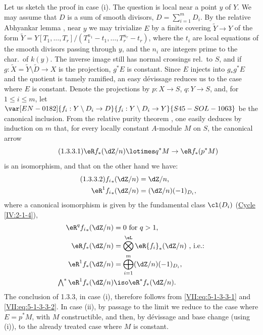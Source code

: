 Let us sketch the proof in case (i). The question is local near a point $y$
of $Y$. We may assume that $D$ is a sum of smooth divisors,
$D=\sum_{i=1}^m D_i$. By the relative Abhyankar lemma
, near $y$ we may trivialize $E$ by a finite covering
$\widetilde Y\to Y$ of the form
$\widetilde Y=Y[T_1,\dots,T_r]/(T_1^{n_1}-t_1,\dots,T_r^{n_r}-t_r)$, where the
$t_i$ are local equations of the smooth divisors passing through $y$, and the
$n_i$ are integers prime to the char.\ of $k(y)$. The inverse image
 still has normal crossings rel.\ to $S$, and
if $g:\widetilde X=\widetilde Y\setminus \widetilde D\to X$ is the projection,
$g^\ast E$ is constant. Since $E$ injects into $g_\ast g^\ast E$ and the
quotient is tamely ramified, an easy dévissage reduces us to the case where
$E$ is constant. Denote the projections by $p:X\to S$, $q:Y\to S$, and, for
$1\leqslant i\leqslant m$, let $\var[EN-0182]{f_i:Y\setminus D_i \to D}{f_i:Y\setminus D_i \to Y}{S45-SOL-1063}$ be the canonical
inclusion. From the relative purity theorem , one easily
deduces by induction on $m$ that, for every locally constant $A$-module $M$ on
$S$, the canonical arrow
\begin{equation*}\tag{1.3.3.1}\label{VII:eq:5-1-3-3-1} %
  \eR f_\ast (\dZ/n)\lotimes q^\ast M\to \eR f_\ast (p^\ast M) 
\end{equation*}
is an isomorphism, and that on the other hand we have:
\begin{align*}\tag{1.3.3.2}\label{VII:eq:5-1-3-3-2}
  {f_i}_\ast(\dZ/n) &= \dZ/n \text{,} \\
  \eR^1 {f_i}_\ast (\dZ/n) &= (\dZ/n)(-1)_{D_i} \text{,} 
\end{align*}
where a canonical isomorphism is given by the fundamental class $\cl(D_i)$
(\hyperref[IV]{Cycle} \ref{IV:2-1-4}),
\begin{align*}
  \eR^q {f_i}_\ast(\dZ/n) &= 0\text{ for $q>1$,} \\
  \eR f_\ast (\dZ/n) &= \bigotimes^\eL \eR {f_i}_\ast (\dZ/n) \text{ , i.e.:} \\
  \eR^1 f_\ast(\dZ/n) &= \bigoplus_{i=1}^m (\dZ/n)(-1)_{D_i} \text{,} \\
  \textstyle\bigwedge^\ast \eR^1 f_\ast(\dZ/n) &\iso \eR^\ast f_\ast (\dZ/n) \text{.} 
\end{align*}
The conclusion of 1.3.3, in case (i), therefore follows from
\eqref{VII:eq:5-1-3-3-1} and \eqref{VII:eq:5-1-3-3-2}. In case (ii), by
passage to the limit we reduce to the case where $E=p^\ast M$, with $M$
constructible, and then, by dévissage and base change (using (i)), to the
already treated case where $M$ is constant.

